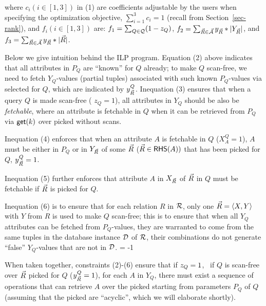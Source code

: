 \vspace{-0.7ex}

\sstab
where $c_{i} (i\in[1, 3])$  in (1) are coefficients adjustable
by the users when specifying the
optimization objective,  $\sum_{i=1}^{3}c_{i} = 1$ (recall
from Section~\ref{sec-rank}), and $f_{i}(i\in [1, 3])$ are:
  $f_{1} = \textstyle\sum_{Q\in \mathcal Q} (1-z_{Q})$,
  $f_{2} = \textstyle\sum_{\vec{R}\in \vec{{\mathcal A}}} y_{\vec{R}}*|Y_{\vec{R}}|$,
  and
  $f_{3} = \textstyle\sum_{\vec{R}\in \vec{{\mathcal A}}} y_{\vec{R}}*|\vec{R}|$.


 \vspace{0.6ex}
Below we give intuition behind the ILP program.
Equation (2) above indicates that all
attributes in $P_{Q}$ are ``known'' for $Q$ already; to make
$Q$ scan-free, we need to fetch $Y_{Q}$-values (partial tuples) associated
with such known $P_{Q}$-values via selected \bss for
$Q$, which are indicated by $y_{\vec{R}}^{Q}$.
Inequation (3) ensures that when a query $Q$ is made scan-free (\ie
$z_{Q} = 1$), all attributes in $Y_{Q}$ should be also be
{\em fetchable}, where an attribute is fetchable in $Q$
when it can be retrieved from $P_{Q}$ via $\protect\mathsf{get}(k)$ over picked
\bss without scans.


\vspace{0.6ex}
Inequation (4) enforces that when an attribute $A$ is fetchable in
$Q$ (\ie $X_{A}^{Q} = 1$), $A$ must be either in $P_{Q}$ or
in $Y_{\vec{R}}$ of some \bs $\vec{R}$ ($\vec{R} \in {\ensuremath {\mathsf{RHS}}}(A))$
that has been picked for $Q$, \ie $y_{\vec{R}}^{Q} = 1$.

Inequation (5) further enforces that attribute $A$ in $X_{\vec{R}}$
of $\vec{R}$ in $Q$ must be fetchable if $\vec{R}$ is picked for $Q$.

\vspace{0.6ex}
Inequation (6) is to ensure that for each relation $R$ in ${\mathcal R}$,
only one \bs $\vec{R} \allowbreak =\allowbreak \langle X,\allowbreak Y\rangle$ with $Y$ from $R$ is used
to make $Q$ scan-free; this is to ensure that when all $Y_{Q}$ attributes
can be fetched from $P_{Q}$-values, they are warranted to come from
the same tuples in the database instance $\mathcal D$ of ${\mathcal R}$, \ie their
combinations do not generate ``false'' $Y_{Q}$-values that are
not in $\mathcal D$.
\looseness = -1

\vspace{0.8ex}
When taken together,
constraints (2)-(6) ensure that if $z_{Q}\allowbreak
=\allowbreak 1$, \ie~if $Q$ is scan-free over \bss $\vec{R}$ picked for $Q$
($y_{\vec{R}}^{Q}\allowbreak =\allowbreak 1$), for each $A$ in $Y_{Q}$,
there must exist a sequence of \get operations that can retrieve
$A$ over the picked \bss starting from parameters $P_{Q}$ of $Q$
(assuming that the picked \bss are ``acyclic'', which we will
elaborate shortly).


